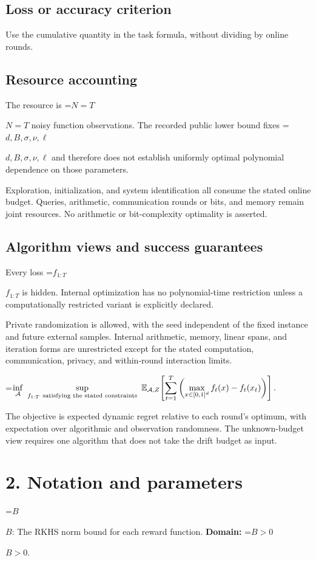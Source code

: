 \documentclass[10pt,a4paper]{article}
\newcommand{\AtlasMath}[1]{\par\begingroup\centering\setbox0=\hbox{$\displaystyle #1$}\ifdim\wd0>1.4\linewidth\typeout{ATLAS WIDE FORMULA: \the\wd0}\fi\ifdim\wd0>\linewidth\resizebox{\linewidth}{!}{\box0}\else\box0\fi\par\endgroup}
\newcommand{\AtlasInlineMath}[1]{\begingroup\setbox0=\hbox{$#1$}\ifdim\wd0>.4\linewidth\endgroup\AtlasMath{#1}\else\endgroup$#1$\fi}
\begin{document}
\subsection{Loss or accuracy criterion}
Use the cumulative quantity in the task formula, without dividing by online rounds.

\subsection{Resource accounting}
The resource is \AtlasInlineMath{N=T} noisy function observations. The recorded public lower bound fixes \AtlasInlineMath{d,B,\sigma,\nu,\ell} and therefore does not establish uniformly optimal polynomial dependence on those parameters.

Exploration, initialization, and system identification all consume the stated online budget. Queries, arithmetic, communication rounds or bits, and memory remain joint resources. No arithmetic or bit-complexity optimality is asserted.

\subsection{Algorithm views and success guarantees}
Every loss \AtlasInlineMath{f_{1:T}} is hidden. Internal optimization has no polynomial-time restriction unless a computationally restricted variant is explicitly declared.

Private randomization is allowed, with the seed independent of the fixed instance and future external samples. Internal arithmetic, memory, linear spans, and iteration forms are unrestricted except for the stated computation, communication, privacy, and within-round interaction limits.


\AtlasMath{\inf_{\mathcal{A}}\ \sup_{f_{1:T}\ \text{\text{satisfying the stated constraints}}}\ \mathbb{E}_{\mathcal{A},Z}\!\left[\sum_{t=1}^{T}\left(\max_{x\in[0,1]^d}f_t(x)-f_t(x_t)\right)\right].}


The objective is expected dynamic regret relative to each round’s optimum, with expectation over algorithmic and observation randomness. The unknown-budget view requires one algorithm that does not take the drift budget as input.

\section{2. Notation and parameters}
\AtlasInlineMath{B}: The RKHS norm bound for each reward function. \textbf{Domain:} \AtlasInlineMath{B>0}.
\end{document}
